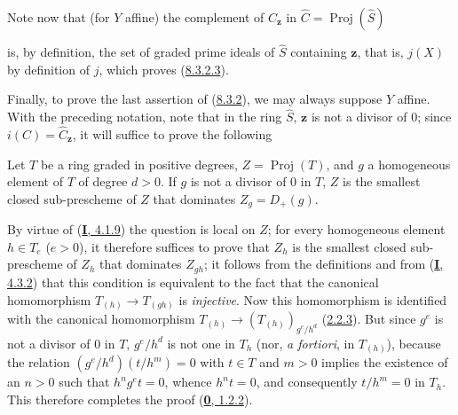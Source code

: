 Note now that (for $Y$ affine) the complement of
$\widehat{C}_{\mathbf{z}}$ in $\widehat{C}=\operatorname{Proj}(\widehat{S})$

is, by definition, the set of graded prime ideals of $\widehat{S}$
containing $\mathbf{z}$, that is, $j(X)$ by definition of $j$, which proves
(\hyperref[II.8.3.2.3]{8.3.2.3}).

Finally, to prove the last assertion of
(\hyperref[II.8.3.2]{8.3.2}), we may always suppose $Y$ affine. With
the preceding notation, note that in the ring $\widehat{S}$, $\mathbf{z}$
is not a divisor of $0$; since $i(C)=\widehat{C}_{\mathbf{z}}$, it will suffice
to prove the following

\begin{lemma}[8.3.2.7]
\label{II.8.3.2.7}
Let $T$ be a ring graded in positive degrees,
$Z=\operatorname{Proj}(T)$, and $g$ a homogeneous element of $T$ of degree $d>0$.
If $g$ is not a divisor of $0$ in $T$, $Z$ is the smallest closed
sub-prescheme of $Z$ that dominates $Z_g=D_+(g)$.
\end{lemma}

By virtue of (\hyperref[I.4.1.9]{\textbf{I}, 4.1.9}) the question is local on $Z$;
for every homogeneous element $h\in T_e$ ($e>0$), it therefore suffices to prove that
$Z_h$ is the smallest closed sub-prescheme of $Z_h$ that dominates $Z_{gh}$;
it follows from the definitions and from (\hyperref[I.4.3.2]{\textbf{I}, 4.3.2}) that this
condition is equivalent to the fact that the canonical homomorphism
$T_{(h)}\to T_{(gh)}$ is \emph{injective}. Now this homomorphism is identified with
the canonical homomorphism
$T_{(h)}\to(T_{(h)})_{g^e/h^d}$ (\hyperref[II.2.2.3]{2.2.3}). But since
$g^e$ is not a divisor of $0$ in $T$, $g^e/h^d$ is not one in $T_h$
(nor, \emph{a fortiori}, in $T_{(h)}$), because the relation
$(g^e/h^d)(t/h^m)=0$ with $t\in T$ and $m>0$ implies the existence of an $n>0$
such that $h^ng^et=0$, whence $h^nt=0$, and consequently $t/h^m=0$ in $T_h$. This
therefore completes the proof (\hyperref[0.1.2.2]{\textbf{0}, 1.2.2}).

